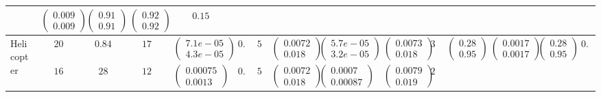 \begin{table*}[t]
\begin{tabular}{|p{1.5cm}|c|c|c|c|c|c|c|c|c|c|c|c|c|c|}
&$\begin{pmatrix}0.009  \\ 0.009 \end{pmatrix}$ &$\begin{pmatrix}0.91  \\ 0.91 \end{pmatrix}$ &$\begin{pmatrix}0.92  \\ 0.92 \end{pmatrix}$ & $0.15$  \\ 
\hline 

\multirow{3}{*}{\parbox{1.5cm}{Helicopter}} 
& $20$ 
& $0.84$ & $17$ 
&$\begin{pmatrix}7.1e-05  \\ 4.3e-05\end{pmatrix}$ & $0.6 $ & {$5$} 
&$\begin{pmatrix}0.0072  \\ 0.018 \end{pmatrix}$ &$\begin{pmatrix}5.7e-05  \\ 3.2e-05 \end{pmatrix}$ &$\begin{pmatrix}0.0073  \\ 0.018 \end{pmatrix}$ & $35$ 
&$\begin{pmatrix}0.28  \\ 0.95 \end{pmatrix}$ &$\begin{pmatrix}0.0017  \\ 0.0017 \end{pmatrix}$ &$\begin{pmatrix}0.28  \\ 0.95 \end{pmatrix}$ & $0.49$  \\ 
\cline{2-15} 
& $16$ 
& $28$ & $12$ 
&$\begin{pmatrix}0.00075  \\ 0.0013\end{pmatrix}$ & $0.56 $ & {$5$} 
&$\begin{pmatrix}0.0072  \\ 0.018 \end{pmatrix}$ &$\begin{pmatrix}0.0007  \\ 0.00087 \end{pmatrix}$ &$\begin{pmatrix}0.0079  \\ 0.019 \end{pmatrix}$ & $23$ 

\end{tabular}
\end{table*}
